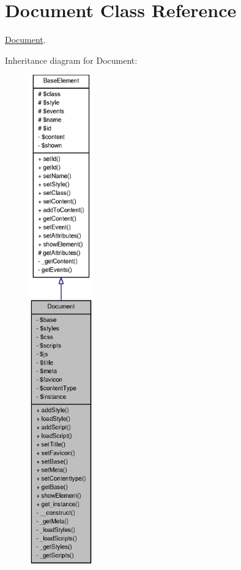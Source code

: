 \section{Document Class Reference}
\label{classDocument}


\hyperlink{classDocument}{Document}.  




Inheritance diagram for Document:\nopagebreak
\begin{figure}[H]
\begin{center}
\leavevmode
\includegraphics[height=600pt]{classDocument__inherit__graph}
\end{center}
\end{figure}


